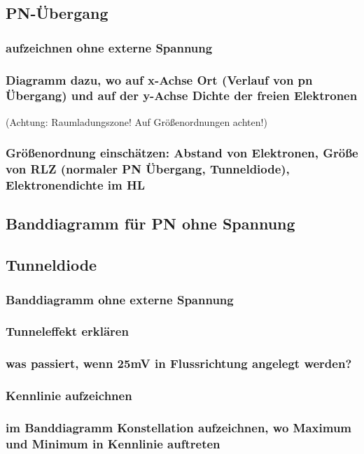 \documentclass{article}
\begin{document}
\subsection{PN-Übergang}\label{k5:pn}
	\subsubsection{aufzeichnen ohne externe Spannung}
	\subsubsection{Diagramm dazu, wo auf x-Achse Ort (Verlauf von pn Übergang) und auf der y-Achse Dichte der freien Elektronen}
	(Achtung: Raumladungszone! Auf Größenordnungen achten!)
	\subsubsection{Größenordnung einschätzen: Abstand von Elektronen, Größe von RLZ (normaler PN Übergang, Tunneldiode), Elektronendichte im HL}

\subsection{Banddiagramm für PN ohne Spannung}\label{k5:pnBand}
\subsection{Tunneldiode}\label{k5:tunnelDiode}
	\subsubsection{Banddiagramm ohne externe Spannung}
	\subsubsection{Tunneleffekt erklären}
	\subsubsection{was passiert, wenn 25mV in Flussrichtung angelegt werden?}
	\subsubsection{Kennlinie aufzeichnen}
	\subsubsection{im Banddiagramm Konstellation aufzeichnen, wo Maximum und Minimum in Kennlinie auftreten}
\end{document}
